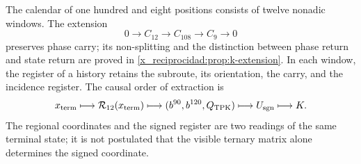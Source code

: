 The calendar of one hundred and eight positions consists of twelve nonadic windows. The extension
\[
 0\longrightarrow C_{12}\longrightarrow C_{108}
 \longrightarrow C_9\longrightarrow0
\]
preserves phase carry; its non-splitting and the distinction between phase return and state return are proved in \cref{x_reciprocidad:prop:k-extension}. In each window, the register of a history retains the subroute, its orientation, the carry, and the incidence register. The causal order of extraction is
\begin{equation}
 x_{\rm term}\longmapsto\mathcal R_{12}(x_{\rm term})
 \longmapsto(b^{90},b^{120},Q_{\rm TPK})
 \longmapsto U_{\rm sgn}\longmapsto K.
 \label{x_reciprocidad:lib01:cadena-registro}
\end{equation}
The regional coordinates and the signed register are two readings of the same terminal state; it is not postulated that the visible ternary matrix alone determines the signed coordinate.

